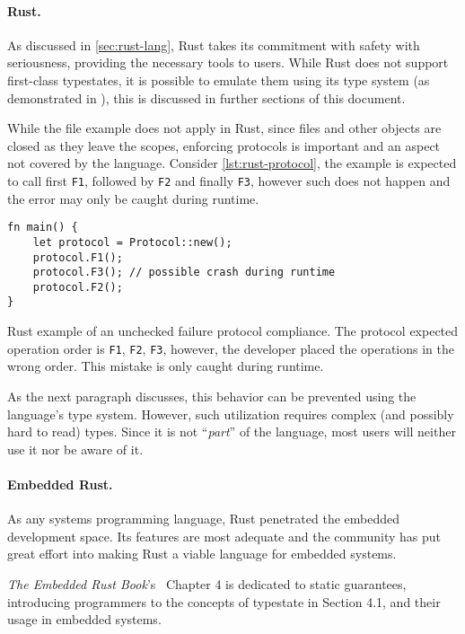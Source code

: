 \paragraph{Rust.}
As discussed in \autoref{sec:rust-lang}, Rust takes its commitment with safety with seriousness,
providing the necessary tools to users.
While Rust does not support first-class typestates,
it is possible to emulate them using its type system (as demonstrated in \autocite{Duarte2020}),
this is discussed in further sections of this document.

While the file example does not apply in Rust, since files and other objects are closed as they leave the scopes,
enforcing protocols is important and an aspect not covered by the language.
Consider \autoref{lst:rust-protocol}, the example is expected to call first \texttt{F1}, followed by \texttt{F2} and finally \texttt{F3},
however such does not happen and the error may only be caught during runtime.

\begin{listing}
    \centering
    \begin{verbatim}
fn main() {
    let protocol = Protocol::new();
    protocol.F1();
    protocol.F3(); // possible crash during runtime
    protocol.F2();
}
    \end{verbatim}
    \caption{
        Rust example of an unchecked failure protocol compliance.
        The protocol expected operation order is \texttt{F1}, \texttt{F2}, \texttt{F3},
        however, the developer placed the operations in the wrong order.
        This mistake is only caught during runtime.
    }
    \label{lst:rust-protocol}
\end{listing}

As the next paragraph discusses, this behavior can be prevented using the language's type system.
However, such utilization requires complex (and possibly hard to read) types.
Since it is not “\emph{part}” of the language, most users will neither use it nor be aware of it.

\paragraph{Embedded Rust.} As any systems programming language, Rust penetrated the embedded development space.
Its features are most adequate and the community has put great effort into making Rust a viable language for embedded systems.

\emph{The Embedded Rust Book}'s~\autocite{Rust2021} Chapter 4 is dedicated to static guarantees,
introducing programmers to the concepts of typestate in Section 4.1, and their usage in embedded systems.

